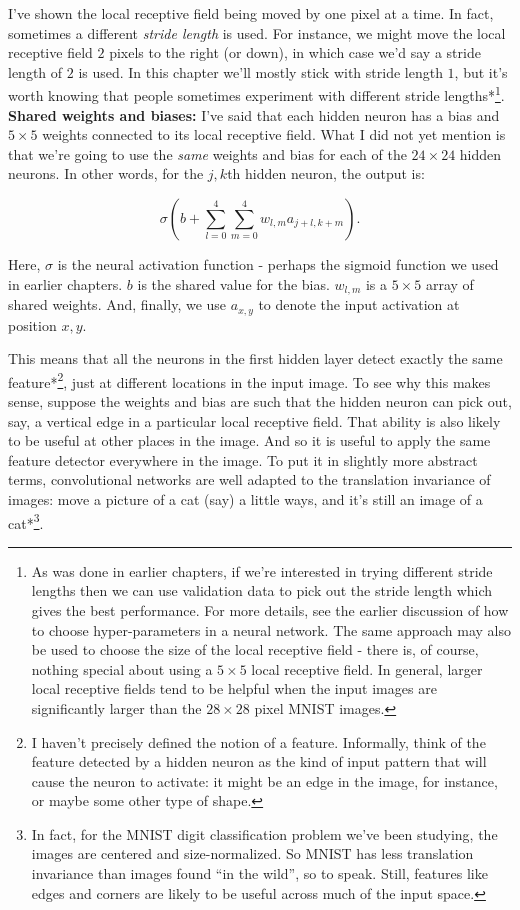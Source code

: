 I've shown the local receptive field being moved by one pixel at a time. In fact, sometimes a different \emph{stride length} is used. For instance, we might move the local receptive field $2$ pixels to the right (or down), in which case we'd say a stride length of $2$ is used. In this chapter we'll mostly stick with stride length $1$, but it's worth knowing that people sometimes experiment with different stride lengths*\footnote{As was done in earlier chapters, if we're interested in trying different stride lengths then we can use validation data to pick out the stride length which gives the best performance. For more details, see the earlier discussion of how to choose hyper-parameters in a neural network. The same approach may also be used to choose the size of the local receptive field - there is, of course, nothing special about using a $5 \times 5$ local receptive field. In general, larger local receptive fields tend to be helpful when the input images are significantly larger than the $28 \times 28$ pixel MNIST images.}. \textbf{Shared weights and biases:} I've said that each hidden neuron has a bias and $5 \times 5$ weights connected to its local receptive field. What I did not yet mention is that we're going to use the \emph{same} weights and bias for each of the $24 \times 24$ hidden neurons. In other words, for the $j, k$th hidden neuron, the output is:

\begin{equation}
\sigma\left(b + \sum_{l=0}^4 \sum_{m=0}^4 w_{l,m} a_{j+l, k+m} \right).
\tag{125}
\end{equation}

\noindent Here, $\sigma$ is the neural activation function - perhaps the sigmoid function we used in earlier chapters. $b$ is the shared value for the bias. $w_{l,m}$ is a $5 \times 5$ array of shared weights. And, finally, we use $a_{x, y}$ to denote the input activation at position $x, y$.


This means that all the neurons in the first hidden layer detect exactly the same feature*\footnote{I haven't precisely defined the notion of a feature. Informally, think of the feature detected by a hidden neuron as the kind of input pattern that will cause the neuron to activate: it might be an edge in the image, for instance, or maybe some other type of shape.}, just at different locations in the input image. To see why this makes sense, suppose the weights and bias are such that the hidden neuron can pick out, say, a vertical edge in a particular local receptive field. That ability is also likely to be useful at other places in the image. And so it is useful to apply the same feature detector everywhere in the image. To put it in slightly more abstract terms, convolutional networks are well adapted to the translation invariance of images: move a picture of a cat (say) a little ways, and it's still an image of a cat*\footnote{In fact, for the MNIST digit classification problem we've been studying, the images are centered and size-normalized. So MNIST has less translation invariance than images found ``in the wild'', so to speak. Still, features like edges and corners are likely to be useful across much of the input space.}.


